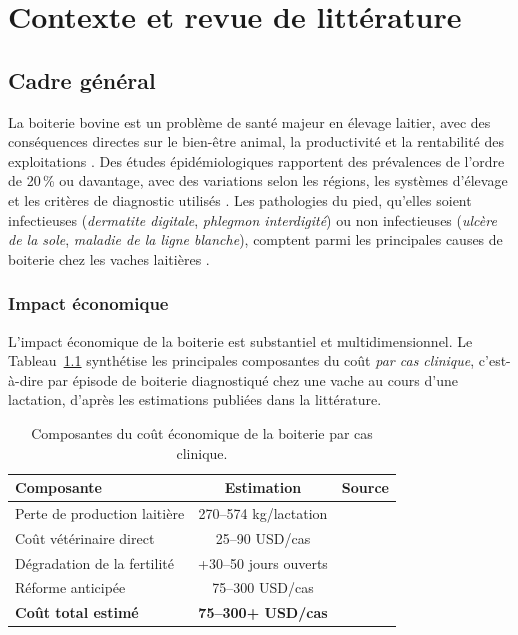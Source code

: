 \chapter{Contexte et revue de littérature}
\label{chapitre:contexte}

\section{Cadre général}

La boiterie bovine est un problème de santé majeur en élevage laitier, avec des conséquences
directes sur le bien-être animal, la productivité et la rentabilité des exploitations
\citep{rodrigues2017lameness}.
Des études épidémiologiques rapportent des prévalences de l'ordre de 20\,\% ou davantage,
avec des variations selon les régions, les systèmes d'élevage et les critères de diagnostic
utilisés
\citep{whay2003assessment,cook2003prevalence}. Les pathologies du pied, qu'elles soient
infectieuses (\textit{dermatite digitale}, \textit{phlegmon interdigité}) ou non
infectieuses (\textit{ulcère de la sole}, \textit{maladie de la ligne blanche}),
comptent parmi les principales causes de boiterie chez les vaches laitières
\citep{merck_hoof_origin_lameness_cattle,flower2006effect}.

\subsection{Impact économique}
L'impact économique de la boiterie est substantiel et multidimensionnel. Le
Tableau~\ref{tab:impact_economique} synthétise les principales composantes du coût
\textit{par cas clinique}, c'est-à-dire par épisode de boiterie diagnostiqué chez une
vache au cours d'une lactation, d'après les estimations publiées dans la littérature.

\begin{table}[H]
    \centering
    \caption{Composantes du coût économique de la boiterie par cas clinique.}
    \label{tab:impact_economique}
    \begin{tabular}{lcc}
        \toprule
        \textbf{Composante} & \textbf{Estimation} & \textbf{Source} \\
        \midrule
        Perte de production laitière & 270--574 kg/lactation & \cite{green2002financial} \\
        Coût vétérinaire direct & 25--90 USD/cas & \cite{bruijnis2010assessing} \\
        Dégradation de la fertilité & +30--50 jours ouverts & \cite{green2002financial} \\
        Réforme anticipée & 75--300 USD/cas & \cite{bruijnis2010assessing} \\
        \midrule
        \textbf{Coût total estimé} & \textbf{75--300+ USD/cas} & \\
        \bottomrule
    \end{tabular}
\end{table}
\vspace{-0.9\baselineskip}

